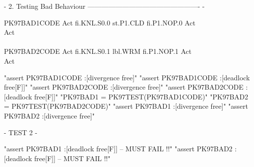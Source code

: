 {- 2. Testing Bad Behaviour ------------------------------------------------- -}
\begin{circus}
\circprocess PK97BAD1CODE \circdef \circbegin
  Act \circdef fi.KNL.S0.0 \then st.P1.CLD \then fi.P1.NOP.0 \then Act\\
  \circspot Act\\
 \circend\\
\circprocess PK97BAD2CODE \circdef\circbegin
  Act \circdef fi.KNL.S0.1 \then lbl.WRM \then fi.P1.NOP.1 \then Act\\
  \circspot Act\\
 \circend
 \end{circus}
\begin{assert}
"assert PK97BAD1CODE :[divergence free]"
\also "assert PK97BAD1CODE :[deadlock free[F]]"
\also "assert PK97BAD2CODE :[divergence free]"
\also "assert PK97BAD2CODE :[deadlock free[F]]"
\also "PK97BAD1 = PK97TEST(PK97BAD1CODE)"
\also "PK97BAD2 = PK97TEST(PK97BAD2CODE)"
\also "assert PK97BAD1 :[divergence free]"
\also "assert PK97BAD2 :[divergence free]"
\end{assert}
{- TEST 2 -}
\begin{assert}
"assert PK97BAD1 :[deadlock free[F]]  -- MUST FAIL !!"
\also "assert PK97BAD2 :[deadlock free[F]]  -- MUST FAIL !!"
\end{assert}

